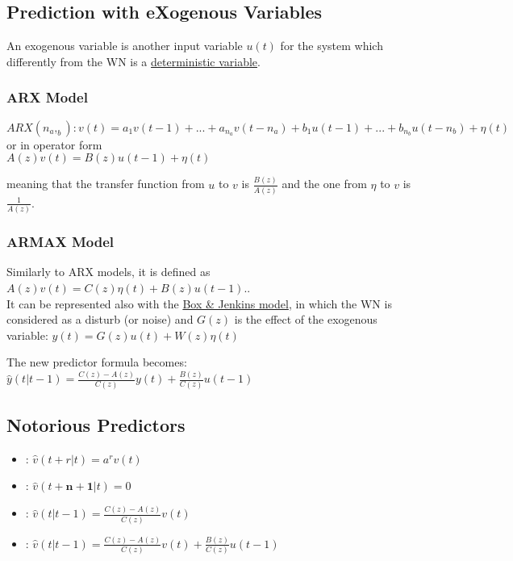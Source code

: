 \documentclass[10pt,a4paper]{article}
\begin{document}
\subsection{Prediction with eXogenous Variables}
An exogenous variable is another input variable $u(t)$ for the system which differently from the WN is a \uline{deterministic variable}.
\subsubsection{ARX Model}
\center $ARX(n_a,_b): v(t)=a_1v(t-1)+...+a_{n_a}v(t-n_a)+b_1u(t-1)+...+b_{n_b}u(t-n_b)+\eta(t)$ 
\\ \vspace{0.3em}
or in operator form
\\ \vspace{0.3em}
$A(z)v(t)=B(z)u(t-1)+\eta(t)$
\\ \raggedright \vspace{0.5em}
meaning that the transfer function from $u$ to $v$ is $\frac{B(z)}{A(z)}$ and the one from $\eta$ to $v$ is $\frac{1}{A(z)}$.
\subsubsection{ARMAX Model}
Similarly to ARX models, it is defined as $A(z)v(t)=C(z)\eta(t)+B(z)u(t-1).$. \\
It can be represented also with the \uline{Box \& Jenkins model}, in which the WN is considered as a disturb (or noise) and $G(z)$ is the effect of the exogenous variable: 
\center 
$y(t)=G(z)u(t)+W(z)\eta(t)$
\\ \raggedright \vspace{0.5em}
The new predictor formula becomes:
\center 
$\hat{y}(t|t-1)=\frac{C(z)-A(z)}{C(z)}y(t)+\frac{B(z)}{C(z)}u(t-1)$
\\ \raggedright
\subsection{Notorious Predictors}
\begin{itemize}
	\item {}: $\hat{v}(t+r|t)=a^rv(t)$  
	\item {}: $\hat{v}(t+\bm{n+1}|t)=0$ 
	\item {}: $\hat{v}(t|t-1)=\frac{C(z)-A(z)}{C(z)}v(t)$
	\item {}: $\hat{v}(t|t-1)=\frac{C(z)-A(z)}{C(z)}v(t) + \frac{B(z)}{C(z)}u(t-1)$
\end{itemize}
\end{document}
